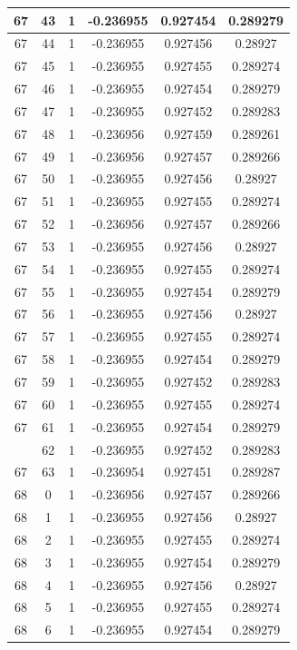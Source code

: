 \documentclass[12pt,a4paper]{article}
\numberwithin{equation}{section}
\numberwithin{figure}{section}
\numberwithin{table}{section}
\begin{document}
\begin{longtable}{|c|c|c|c|c|c|}
67 & 43 & 1 & -0.236955 & 0.927454 & 0.289279 \\ \hline
67 & 44 & 1 & -0.236955 & 0.927456 & 0.28927 \\ \hline
67 & 45 & 1 & -0.236955 & 0.927455 & 0.289274 \\ \hline
67 & 46 & 1 & -0.236955 & 0.927454 & 0.289279 \\ \hline
67 & 47 & 1 & -0.236955 & 0.927452 & 0.289283 \\ \hline
67 & 48 & 1 & -0.236956 & 0.927459 & 0.289261 \\ \hline
67 & 49 & 1 & -0.236956 & 0.927457 & 0.289266 \\ \hline
67 & 50 & 1 & -0.236955 & 0.927456 & 0.28927 \\ \hline
67 & 51 & 1 & -0.236955 & 0.927455 & 0.289274 \\ \hline
67 & 52 & 1 & -0.236956 & 0.927457 & 0.289266 \\ \hline
67 & 53 & 1 & -0.236955 & 0.927456 & 0.28927 \\ \hline
67 & 54 & 1 & -0.236955 & 0.927455 & 0.289274 \\ \hline
67 & 55 & 1 & -0.236955 & 0.927454 & 0.289279 \\ \hline
67 & 56 & 1 & -0.236955 & 0.927456 & 0.28927 \\ \hline
67 & 57 & 1 & -0.236955 & 0.927455 & 0.289274 \\ \hline
67 & 58 & 1 & -0.236955 & 0.927454 & 0.289279 \\ \hline
67 & 59 & 1 & -0.236955 & 0.927452 & 0.289283 \\ \hline
67 & 60 & 1 & -0.236955 & 0.927455 & 0.289274 \\ \hline
67 & 61 & 1 & -0.236955 & 0.927454 & 0.289279 \\ \hline
\pagebreak
67 & 62 & 1 & -0.236955 & 0.927452 & 0.289283 \\ \hline
67 & 63 & 1 & -0.236954 & 0.927451 & 0.289287 \\ \hline
68 & 0 & 1 & -0.236956 & 0.927457 & 0.289266 \\ \hline
68 & 1 & 1 & -0.236955 & 0.927456 & 0.28927 \\ \hline
68 & 2 & 1 & -0.236955 & 0.927455 & 0.289274 \\ \hline
68 & 3 & 1 & -0.236955 & 0.927454 & 0.289279 \\ \hline
68 & 4 & 1 & -0.236955 & 0.927456 & 0.28927 \\ \hline
68 & 5 & 1 & -0.236955 & 0.927455 & 0.289274 \\ \hline
68 & 6 & 1 & -0.236955 & 0.927454 & 0.289279 \\ \hline

\end{longtable}
\end{document}
